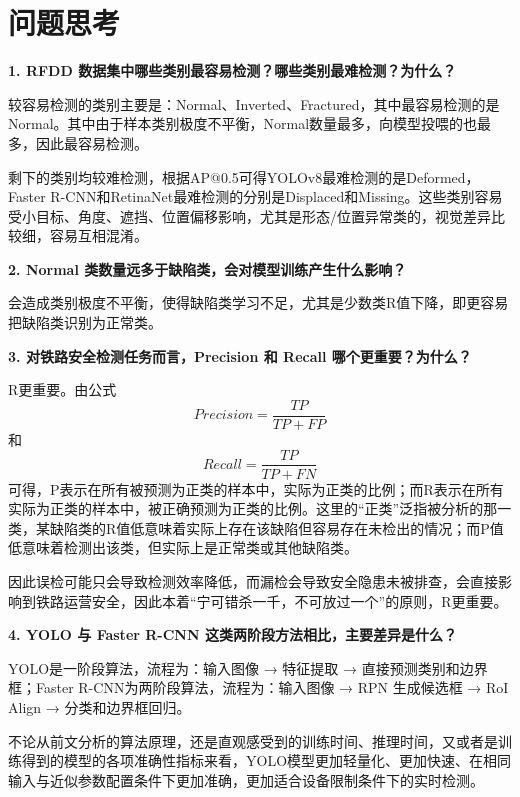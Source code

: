 \documentclass[12pt, oneside, a4paper]{ctexart}
\begin{document}
\section{问题思考}
\par{}
\noindent\textbf{\heiti{}1. RFDD 数据集中哪些类别最容易检测？哪些类别最难检测？为什么？}
\par{}
较容易检测的类别主要是：Normal、Inverted、Fractured，其中最容易检测的是Normal。其中由于样本类别极度不平衡，Normal数量最多，向模型投喂的也最多，因此最容易检测。
\par{}
剩下的类别均较难检测，根据AP@0.5可得YOLOv8最难检测的是Deformed，Faster R-CNN和RetinaNet最难检测的分别是Displaced和Missing。这些类别容易受小目标、角度、遮挡、位置偏移影响，尤其是形态/位置异常类的，视觉差异比较细，容易互相混淆。
\par{}
\noindent\textbf{\heiti{}2. Normal 类数量远多于缺陷类，会对模型训练产生什么影响？}
\par{}
会造成类别极度不平衡，使得缺陷类学习不足，尤其是少数类R值下降，即更容易把缺陷类识别为正常类。
\par{}
\noindent\textbf{\heiti{}3. 对铁路安全检测任务而言，Precision 和 Recall 哪个更重要？为什么？}
\par{}
R更重要。由公式
\begin{equation*}
    Precision = \frac{TP}{TP + FP}
\end{equation*}
和
\begin{equation*}
    Recall = \frac{TP}{TP + FN}
\end{equation*}
可得，P表示在所有被预测为正类的样本中，实际为正类的比例；而R表示在所有实际为正类的样本中，被正确预测为正类的比例。这里的“正类”泛指被分析的那一类，某缺陷类的R值低意味着实际上存在该缺陷但容易存在未检出的情况；而P值低意味着检测出该类，但实际上是正常类或其他缺陷类。
\par{}
因此误检可能只会导致检测效率降低，而漏检会导致安全隐患未被排查，会直接影响到铁路运营安全，因此本着“宁可错杀一千，不可放过一个”的原则，R更重要。
\par{}
\noindent\textbf{\heiti{}4. YOLO 与 Faster R-CNN 这类两阶段方法相比，主要差异是什么？}
\par{}
YOLO是一阶段算法，流程为：输入图像 → 特征提取 → 直接预测类别和边界框；Faster R-CNN为两阶段算法，流程为：输入图像 → RPN 生成候选框 → RoI Align → 分类和边界框回归。
\par{}
不论从前文分析的算法原理，还是直观感受到的训练时间、推理时间，又或者是训练得到的模型的各项准确性指标来看，YOLO模型更加轻量化、更加快速、在相同输入与近似参数配置条件下更加准确，更加适合设备限制条件下的实时检测。
\end{document}
